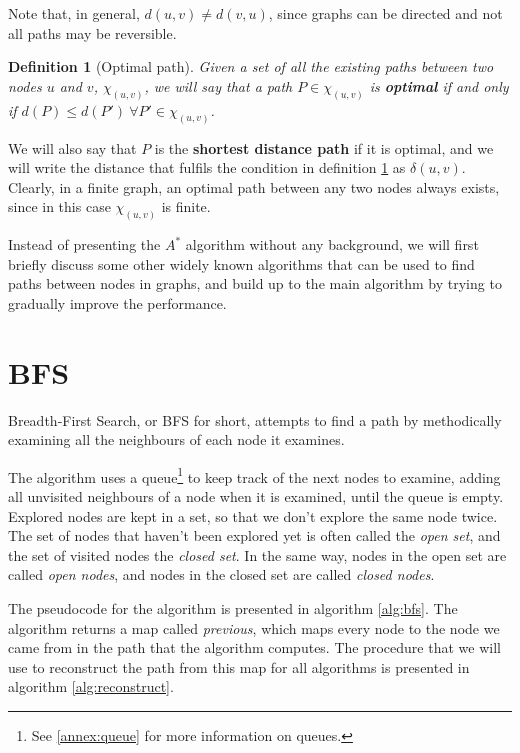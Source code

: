 \documentclass[12pt]{report}
\newtheorem{definition}[theorem]{Definition}
\begin{document}
Note that, in general, $d(u, v) \neq d(v, u)$, since graphs can be directed and not all paths may be reversible.

\begin{definition}[Optimal path]
\label{def:optimal}
Given a set of all the existing paths between two nodes $u$ and $v$, $\chi_{(u, v)}$, we will say that a path $P \in \chi_{(u,v)}$ is \textbf{optimal} if and only if $d(P) \le d(P') \ \forall P' \in \chi_{(u, v)}$.
\end{definition}

We will also say that $P$ is the \textbf{shortest distance path} if it is optimal, and we will write the distance that fulfils the condition in definition \ref{def:optimal} as $\delta(u,v)$. Clearly, in a finite graph, an optimal path between any two nodes always exists, since in this case $\chi_{(u, v)}$ is finite.

Instead of presenting the $A^*$ algorithm without any background, we will first briefly discuss some other widely known algorithms that can be used to find paths between nodes in graphs, and build up to the main algorithm by trying to gradually improve the performance.

\section{BFS}
Breadth-First Search, or BFS for short, attempts to find a path by methodically examining all the neighbours of each node it examines.

The algorithm uses a queue\footnote{See \ref{annex:queue} for more information on queues.} to keep track of the next nodes to examine, adding all unvisited neighbours of a node when it is examined, until the queue is empty. Explored nodes are kept in a set, so that we don't explore the same node twice. The set of nodes that haven't been explored yet is often called the \emph{open set}, and the set of visited nodes the \emph{closed set}. In the same way, nodes in the open set are called \emph{open nodes}, and nodes in the closed set are called \emph{closed nodes}.

The pseudocode for the algorithm is presented in algorithm \ref{alg:bfs}. The algorithm returns a map called \emph{previous}, which maps every node to the node we came from in the path that the algorithm computes. The procedure that we will use to reconstruct the path from this map for all algorithms is presented in algorithm \ref{alg:reconstruct}.
\end{document}

